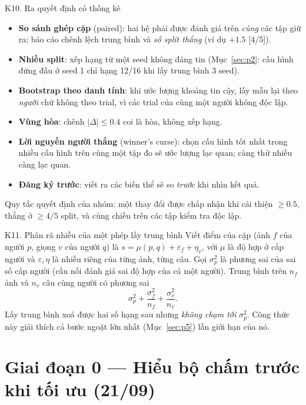 \documentclass[11pt,a4paper,oneside]{report}
\begin{document}
\begin{knowledge}{K10. Ra quyết định có thống kê}
\begin{itemize}
\item \textbf{So sánh ghép cặp} (paired): hai hệ phải được đánh giá trên \emph{cùng} các tập giữ ra; báo cáo chênh lệch trung bình và \emph{số split thắng} (ví dụ $+1.5$ [4/5]).
\item \textbf{Nhiều split}: xếp hạng từ một seed không đáng tin (Mục~\ref{sec:p2}: cấu hình đứng đầu ở seed 1 chỉ hạng 12/16 khi lấy trung bình 3 seed).
\item \textbf{Bootstrap theo danh tính}: khi ước lượng khoảng tin cậy, lấy mẫu lại theo \emph{người} chứ không theo trial, vì các trial của cùng một người không độc lập.
\item \textbf{Vùng hòa}: chênh $|\Delta|\le0.4$ coi là hòa, không xếp hạng.
\item \textbf{Lời nguyền người thắng} (winner's curse): chọn cấu hình tốt nhất trong nhiều cấu hình trên cùng một tập đo sẽ ước lượng lạc quan; càng thử nhiều càng lạc quan.
\item \textbf{Đăng ký trước}: viết ra các biến thể sẽ so \emph{trước} khi nhìn kết quả.
\end{itemize}
Quy tắc quyết định của nhóm: một thay đổi được chấp nhận khi cải thiện $\ge0.5$, thắng ở $\ge4/5$ split, và cùng chiều trên các tập kiểm tra độc lập.
\end{knowledge}

\begin{knowledge}{K11. Phân rã nhiễu của một phép lấy trung bình}
Viết điểm của cặp (ảnh $f$ của người $p$, giọng $v$ của người $q$) là $s=\mu(p,q)+\varepsilon_f+\eta_v$, với $\mu$ là độ hợp ở cấp người và $\varepsilon,\eta$ là nhiễu riêng của từng ảnh, từng câu. Gọi $\sigma_p^2$ là phương sai của sai số cấp người (cầu nối đánh giá sai độ hợp của cả một người). Trung bình trên $n_f$ ảnh và $n_v$ câu cùng người có phương sai
\[
\sigma_p^2+\frac{\sigma_f^2}{n_f}+\frac{\sigma_v^2}{n_v}.
\]
Lấy trung bình xoá được hai số hạng sau nhưng \emph{không chạm tới} $\sigma_p^2$. Công thức này giải thích cả bước ngoặt lớn nhất (Mục~\ref{sec:p5}) lẫn giới hạn của nó.
\end{knowledge}

\section{Giai đoạn 0 --- Hiểu bộ chấm trước khi tối ưu (21/09)}
\label{sec:p0}
\end{document}
